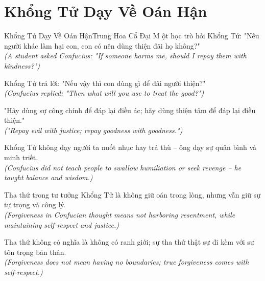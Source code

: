\section{Khổng Tử Dạy Về Oán Hận}
\begin{truyen}{Khổng Tử Dạy Về Oán Hận}{Trung Hoa Cổ Đại}
M ột học trò hỏi Khổng Tử: "Nếu người khác làm hại con, con có nên dùng thiện đãi họ không?"\\
\textit{(A student asked Confucius: "If someone harms me, should I repay them with kindness?")}

Khổng Tử trả lời: "Nếu vậy thì con dùng gì để đãi người thiện?"\\
\textit{(Confucius replied: "Then what will you use to treat the good?")}

"Hãy dùng sự công chính để đáp lại điều ác; hãy dùng thiện tâm để đáp lại điều thiện."\\
\textit{("Repay evil with justice; repay goodness with goodness.")}

Khổng Tử không dạy người ta nuốt nhục hay trả thù -- ông dạy sự quân bình và minh triết.\\
\textit{(Confucius did not teach people to swallow humiliation or seek revenge -- he taught balance and wisdom.)}

Tha thứ trong tư tưởng Khổng Tử là không giữ oán trong lòng, nhưng vẫn giữ sự tự trọng và công lý.\\
\textit{(Forgiveness in Confucian thought means not harboring resentment, while maintaining self-respect and justice.)}

\end{truyen}
\begin{baihoc}
  Tha thứ không có nghĩa là không có ranh giới; sự tha thứ thật sự đi kèm với sự tôn trọng bản thân.\\
  \textit{(Forgiveness does not mean having no boundaries; true forgiveness comes with self-respect.)}
\end{baihoc}

